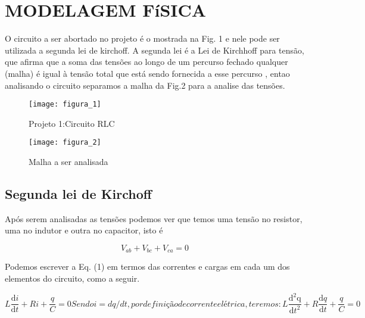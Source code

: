 \documentclass[12pt,fleqn]{article}
\begin{document}
\section{MODELAGEM FíSICA}
O circuito a ser abortado no projeto é o mostrada na Fig. 1 e nele pode ser utilizada a segunda lei de kirchoff\cite{gussow2009eletricidade}. A segunda lei é a Lei de Kirchhoff para tensão, que afirma que a soma das tensões ao longo de um percurso fechado qualquer (malha) é igual à tensão total que está sendo fornecida a esse percurso , entao analisando o circuito separamos a malha da Fig.2 para a analise das tensões.
\begin{figure}[H] %
\vspace{-2pt}
\begin{center}
\texttt{[image: figura\_1]}%
\caption{Projeto 1:Circuito RLC}
\label{fig1}%
\end{center}
\end{figure}

\begin{figure}[H]%
\vspace{-2pt}
\begin{center}
\texttt{[image: figura\_2]}%
\caption{Malha a ser analisada}
\label{fig2}%
\end{center}
\end{figure}

\newpage %
\subsection{Segunda lei de Kirchoff}
 Após serem analisadas as tensões podemos ver que temos uma tensão no resistor, uma no indutor e outra no capacitor, isto é

\begin{equation}
V_{ab}+V_{bc}+V_{ca}=0
\label{eq}
\end{equation}

Podemos escrever a Eq. (1) em termos das correntes e cargas em cada um dos elementos do circuito, como a seguir.

\begin{subequations}
\label{eqn:total}
\begin{equation}
\label{eqn:parcial}
L\frac{\mathrm{d}i }{\mathrm{d} t}+Ri+\frac{q}{C}=0
\end{equation}

Sendo i = dq/dt, por definição de corrente elétrica, teremos:

\begin{equation}
L\frac{\mathrm{d^{2}q} }{\mathrm{d} t^{2}} +R\frac{\mathrm{d} q}{\mathrm{d} t}+\frac{q}{C}=0
\label{eqn:parcia1}
\end{equation}
\end{subequations}
\end{document}
